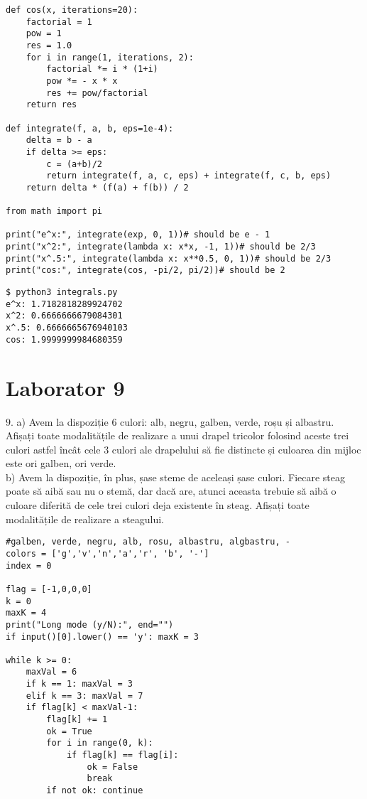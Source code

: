 \documentclass[11pt]{article}
\begin{document}
\begin{itemize}
\begin{itemize}
\begin{verbatim}
def cos(x, iterations=20):
    factorial = 1
    pow = 1
    res = 1.0
    for i in range(1, iterations, 2):
        factorial *= i * (1+i)
        pow *= - x * x
        res += pow/factorial
    return res

def integrate(f, a, b, eps=1e-4):
    delta = b - a
    if delta >= eps: 
        c = (a+b)/2
        return integrate(f, a, c, eps) + integrate(f, c, b, eps)
    return delta * (f(a) + f(b)) / 2

from math import pi

print("e^x:", integrate(exp, 0, 1))# should be e - 1
print("x^2:", integrate(lambda x: x*x, -1, 1))# should be 2/3
print("x^.5:", integrate(lambda x: x**0.5, 0, 1))# should be 2/3
print("cos:", integrate(cos, -pi/2, pi/2))# should be 2
\end{verbatim}

\begin{verbatim}
$ python3 integrals.py
e^x: 1.7182818289924702
x^2: 0.6666666679084301
x^.5: 0.6666665676940103
cos: 1.9999999984680359
\end{verbatim}

\pagebreak

\section*{Laborator 9}
\label{sec:org176d86a}

\(9\). a) Avem la dispoziție 6 culori: alb, negru, galben, verde, roșu și albastru. Afișați toate modalitățile de realizare a unui drapel tricolor folosind aceste trei culori astfel încât cele 3 culori ale drapelului să fie distincte și culoarea din mijloc este ori galben, ori verde.\\
b) Avem la dispoziție, în plus, șase steme de aceleași șase culori. Fiecare steag poate să aibă sau nu o stemă, dar dacă are, atunci aceasta trebuie să aibă o culoare diferită de cele trei culori deja existente în steag. Afișați toate modalitățile de realizare a steagului.

\begin{verbatim}
#galben, verde, negru, alb, rosu, albastru, algbastru, -
colors = ['g','v','n','a','r', 'b', '-']
index = 0

flag = [-1,0,0,0]
k = 0
maxK = 4
print("Long mode (y/N):", end="")
if input()[0].lower() == 'y': maxK = 3

while k >= 0:
    maxVal = 6
    if k == 1: maxVal = 3
    elif k == 3: maxVal = 7
    if flag[k] < maxVal-1:
        flag[k] += 1
        ok = True
        for i in range(0, k):
            if flag[k] == flag[i]: 
                ok = False
                break
        if not ok: continue


\end{verbatim}
\end{itemize}
\end{itemize}
\end{document}

